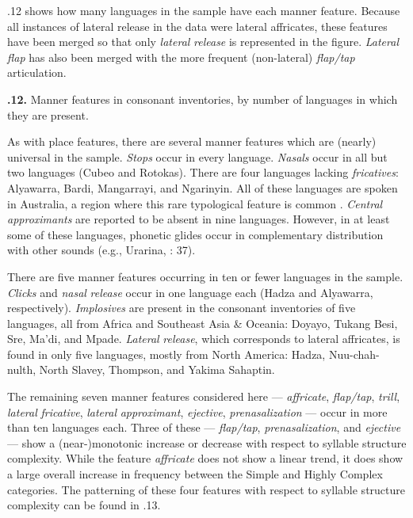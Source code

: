   .12 shows how many languages in the sample have each manner feature. Because all instances of lateral release in the data were lateral affricates, these features have been merged so that only \textit{lateral} \textit{release} is represented in the figure. \textit{Lateral} \textit{flap} has also been merged with the more frequent (non-lateral) \textit{flap/tap} articulation.

\textbf{.12.} Manner features in consonant inventories, by number of languages in which they are present.

  As with place features, there are several manner features which are (nearly) universal in the sample. \textit{Stops} occur in every language. \textit{Nasals} occur in all but two languages (Cubeo and Rotokas). There are four languages lacking \textit{fricatives}: Alyawarra, Bardi, Mangarrayi, and Ngarinyin. All of these languages are spoken in Australia, a region where this rare typological feature is common \citep[42]{Maddieson1984}. \textit{Central} \textit{approximants} are reported to be absent in nine languages. However, in at least some of these languages, phonetic glides occur in complementary distribution with other sounds (e.g., Urarina, \citealt{Olawsky2006}: 37).

  There are five manner features occurring in ten or fewer languages in the sample. \textit{Clicks} and \textit{nasal} \textit{release} occur in one language each (Hadza and Alyawarra, respectively). \textit{Implosives} are present in the consonant inventories of five languages, all from Africa and Southeast Asia \& Oceania: Doyayo, Tukang Besi, Sre, Ma’di, and Mpade. \textit{Lateral} \textit{release}, which corresponds to lateral affricates, is found in only five languages, mostly from North America: Hadza, Nuu-chah-nulth, North Slavey, Thompson, and Yakima Sahaptin.

  The remaining seven manner features considered here — \textit{affricate}, \textit{flap/tap}, \textit{trill}, \textit{lateral} \textit{fricative}, \textit{lateral} \textit{approximant}, \textit{ejective}, \textit{prenasalization} — occur in more than ten languages each. Three of these —  \textit{flap/tap}, \textit{prenasalization}, and \textit{ejective} — show a (near-)monotonic increase or decrease with respect to syllable structure complexity. While the feature \textit{affricate} does not show a linear trend, it does show a large overall increase in frequency between the Simple and Highly Complex categories. The patterning of these four features with respect to syllable structure complexity can be found in .13.


